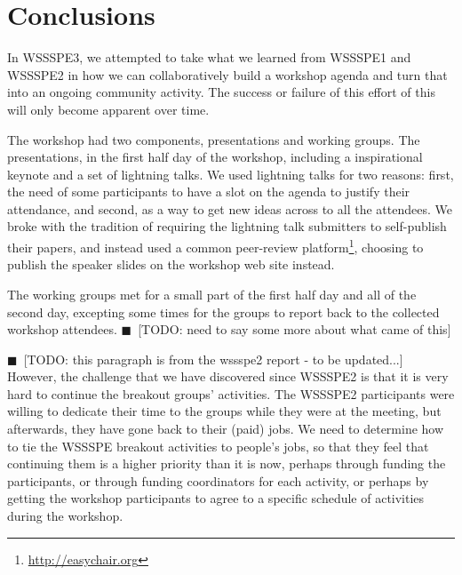 \documentclass[11pt, oneside]{amsart}
\newcommand{\todo}[1]{{\color{blue}$\blacksquare$~\textsf{[TODO: #1]}}}
\begin{document}


%









\section{Conclusions} \label{sec:conclusions}

In WSSSPE3, we attempted to take what we learned from WSSSPE1 and WSSSPE2
in how we can collaboratively build a workshop agenda and turn that into
an ongoing community activity.  The success or failure of this effort
of this will only become apparent over time.

The workshop had two components, presentations and working groups.  The presentations,
in the first half day of the workshop, including a inspirational keynote and a set of lightning
talks.
We used lightning talks for two reasons: first, the need of some participants to have a slot
on the agenda to justify their attendance, and second, as a way to get new ideas across
to all the attendees.  We broke with the tradition of requiring the lightning talk submitters
to self-publish their papers, and instead used a common peer-review platform\footnote{\url{http://easychair.org}}, choosing to publish the speaker slides on the workshop web site
instead.

The working groups met for a small part of the first half day and all of the second day,
excepting some times for the groups to report back to the collected workshop attendees.
\todo{need to say some more about what came of this}

\todo{this paragraph is from the wssspe2 report - to be updated...}
However, the challenge that we have discovered
since WSSSPE2 is that it is very hard to continue the breakout groups'
activities.  The WSSSPE2 participants were willing to dedicate their time to
the groups while they were at the meeting, but afterwards, they have gone
back to their (paid) jobs.  We need to determine how to tie the WSSSPE
breakout activities to people's jobs, so that they feel that continuing them
is a higher priority than it is now, perhaps through funding the participants,
or through funding coordinators for each activity, or perhaps by getting
the workshop participants to agree to a specific schedule of activities during the
workshop.
\end{document}
